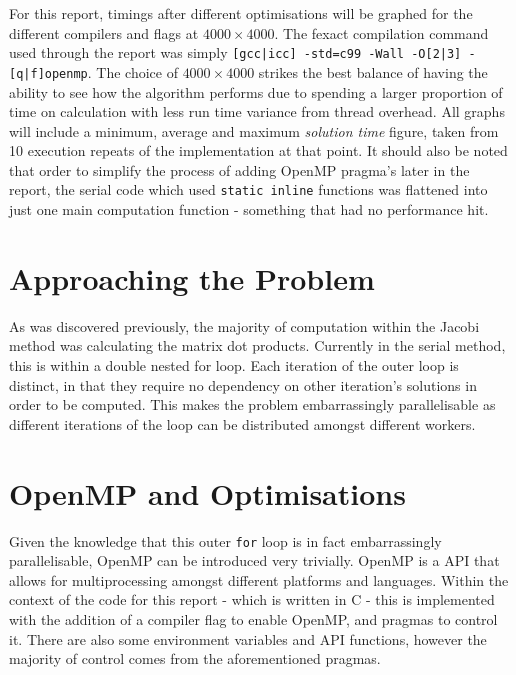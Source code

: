 \documentclass[11pt,twocolumn,a4paper]{article}
\begin{document}
For this report, timings after different optimisations will be graphed for the different compilers and flags at $4000\times4000$. The fexact compilation command used through the report was simply \texttt{[gcc|icc] -std=c99 -Wall -O[2|3] -[q|f]openmp}. The choice of $4000\times4000$ strikes the best balance of having the ability to see how the algorithm performs due to spending a larger proportion of time on calculation with less run time variance from thread overhead. All graphs will include a minimum, average and maximum \textit{solution time} figure, taken from 10 execution repeats of the implementation at that point. It should also be noted that order to simplify the process of adding OpenMP pragma's later in the report, the serial code which used \texttt{static inline} functions was flattened into just one main computation function - something that had no performance hit. \par


\section{Approaching the Problem}
As was discovered previously, the majority of computation within the Jacobi method was calculating the matrix dot products. Currently in the serial method, this is within a double nested for loop. Each iteration of the outer loop is distinct, in that they require no dependency on other iteration's solutions in order to be computed. This makes the problem embarrassingly parallelisable as different iterations of the loop can be distributed amongst different workers. \par


\section{OpenMP and Optimisations}
Given the knowledge that this outer \texttt{for} loop is in fact embarrassingly parallelisable, OpenMP can be introduced very trivially. OpenMP is a API that allows for multiprocessing amongst different platforms and languages. Within the context of the code for this report - which is written in C - this is implemented with the addition of a compiler flag to enable OpenMP, and pragmas to control it. There are also some environment variables and API functions, however the majority of control comes from the aforementioned pragmas.
\end{document}
